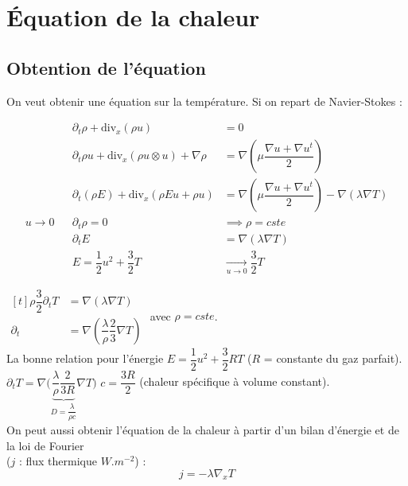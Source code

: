 \documentclass[12pt,a4paper]{article}
\begin{document}
\newpage

\section{Équation de la chaleur}

\subsection{Obtention de l'équation}

On veut obtenir une équation sur la température. Si on repart de Navier-Stokes :

\[
\begin{aligned}
	&&\partial_t\rho + \mathrm{div}_x(\rho u) &=0\\
	&&\partial_t\rho u + \mathrm{div}_x(\rho u \otimes u) + \nabla \rho &= \nabla\left(\mu\dfrac{\nabla u + \nabla u^t}2\right)\\
	&&\partial_t(\rho E) + \mathrm{div}_x(\rho E u + \rho u) &= \nabla\left(\mu\dfrac{\nabla u + \nabla u^t}2\right) - \nabla\left(\lambda \nabla T\right)\\
	u \to 0 && \partial_t\rho = 0 &\implies  \rho = cste\\
	&&\partial_t E &= \nabla\left(\lambda\nabla T\right) \\
	&& E=\dfrac12 u^2 + \dfrac32 T &\underset{u\to 0}\longrightarrow \dfrac32T
\end{aligned}
\]

$\begin{aligned}[t]
	\rho\dfrac32\partial_t T &= \nabla\left(\lambda\nabla T\right)\\
	\partial_t  &= \nabla\left(\dfrac\lambda\rho\dfrac23\nabla T\right)
\end{aligned}$ avec $\rho = cste$.\\

\noindent La bonne relation pour l'énergie $E = \dfrac12 u^2 + \dfrac32 RT$ ($R$ = constante du gaz parfait).\\
$\partial_t T = \nabla\Big(\underbrace{\dfrac\lambda\rho\dfrac2{3R}}_{D=\dfrac\lambda{\rho c}}\nabla T\Big)$ \hspace{1cm} $c= \dfrac{3R}2$ (chaleur spécifique à volume constant).\\

On peut aussi obtenir l'équation de la chaleur à partir d'un bilan d'énergie et de la loi de Fourier\\ ($j$ : flux thermique \hspace{.5cm} $W.m^{-2}$) :
\[
j = -\lambda\nabla_x T
\]
\end{document}
